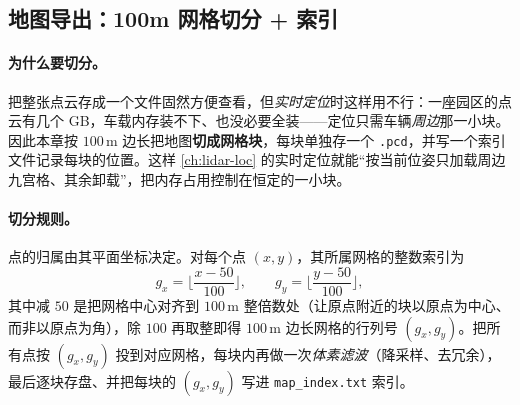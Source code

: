 \subsection{地图导出：100m 网格切分 + 索引}
\label{sec:lidar-map-grid}

\paragraph{为什么要切分。}
把整张点云存成一个文件固然方便查看，但\emph{实时定位}时这样用不行：一座园区的点云有几个 GB，车载内存装不下、也没必要全装——定位只需车辆\emph{周边}那一小块。因此本章按 $100$\,m 边长把地图\textbf{切成网格块}，每块单独存一个 \texttt{.pcd}，并写一个索引文件记录每块的位置。这样 \cref{ch:lidar-loc} 的实时定位就能“按当前位姿只加载周边九宫格、其余卸载”，把内存占用控制在恒定的一小块。

\paragraph{切分规则。}
点的归属由其平面坐标决定。对每个点 $(x,y)$，其所属网格的整数索引为\cite{gao2023slamad}
\begin{equation}
\label{eq:lidar-map-grid}
g_x=\Big\lfloor\frac{x-50}{100}\Big\rfloor,\qquad
g_y=\Big\lfloor\frac{y-50}{100}\Big\rfloor,
\end{equation}
其中减 $50$ 是把网格中心对齐到 $100$\,m 整倍数处（让原点附近的块以原点为中心、而非以原点为角），除 $100$ 再取整即得 $100$\,m 边长网格的行列号 $(g_x,g_y)$。把所有点按 $(g_x,g_y)$ 投到对应网格，每块内再做一次\emph{体素滤波}（降采样、去冗余），最后逐块存盘、并把每块的 $(g_x,g_y)$ 写进 \texttt{map\_index.txt} 索引。

